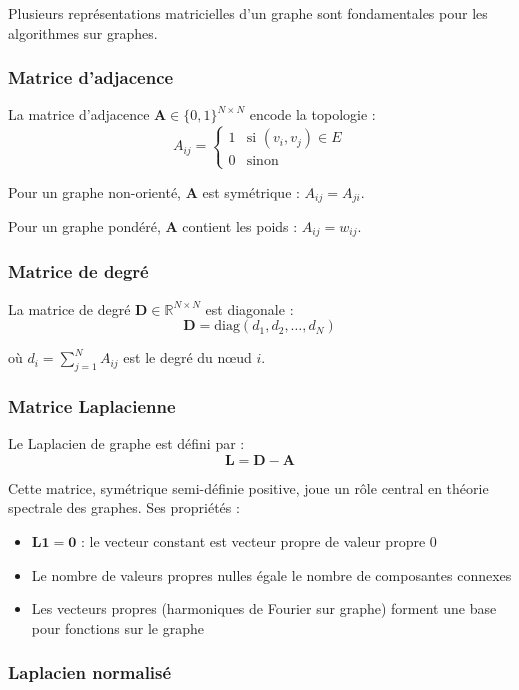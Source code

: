 Plusieurs représentations matricielles d'un graphe sont fondamentales pour les algorithmes sur graphes.

\subsubsection{Matrice d'adjacence}

La matrice d'adjacence $\mathbf{A} \in \{0,1\}^{N \times N}$ encode la topologie :
\[
A_{ij} = \begin{cases}
1 & \text{si } (v_i, v_j) \in E \\
0 & \text{sinon}
\end{cases}
\]

Pour un graphe non-orienté, $\mathbf{A}$ est symétrique : $A_{ij} = A_{ji}$.

Pour un graphe pondéré, $\mathbf{A}$ contient les poids : $A_{ij} = w_{ij}$.

\subsubsection{Matrice de degré}

La matrice de degré $\mathbf{D} \in \mathbb{R}^{N \times N}$ est diagonale :
\[
\mathbf{D} = \text{diag}(d_1, d_2, \ldots, d_N)
\]

où $d_i = \sum_{j=1}^N A_{ij}$ est le degré du nœud $i$.

\subsubsection{Matrice Laplacienne}

Le Laplacien de graphe est défini par :
\[
\mathbf{L} = \mathbf{D} - \mathbf{A}
\]

Cette matrice, symétrique semi-définie positive, joue un rôle central en théorie spectrale des graphes. Ses propriétés :
\begin{itemize}
    \item $\mathbf{L}\mathbf{1} = \mathbf{0}$ : le vecteur constant est vecteur propre de valeur propre 0
    \item Le nombre de valeurs propres nulles égale le nombre de composantes connexes
    \item Les vecteurs propres (harmoniques de Fourier sur graphe) forment une base pour fonctions sur le graphe
\end{itemize}

\subsubsection{Laplacien normalisé}

